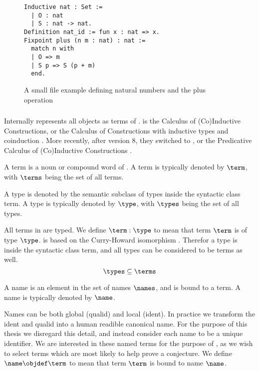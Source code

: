 \begin{figure}[H]
	\begin{lstlisting}[language=Coq, mathescape]
Inductive nat : Set :=
  | O : nat
  | S : nat -> nat.
Definition nat_id := fun x : nat => x.
Fixpoint plus (n m : nat) : nat :=
  match n with
  | O => m
  | S p => S (p + m)
  end.
	\end{lstlisting}
	\caption{A small \gallina \coq file example defining natural numbers and the plus operation}
\end{figure}
\subsubsection{\pcic}

Internally \coq represents all objects as terms  of \cic{}.
\cic is the Calculus of (Co)Inductive Constructions,
or the Calculus of Constructions \cite{coquand1988calculus} with inductive types and coinduction \cite{huet1987induction} \cite{coquand1990inductively}.
More recently, after \coq version 8, they switched to \pcic {}, or the Predicative Calculus of (Co)Inductive Constructions \cite{bertot2013interactive}.

\begin{definition}[term]
	A term is a noun or compound word of \pcic.
	A term is typically denoted by $\term$,
	with $\terms$ being the set of all terms.
\end{definition}

\begin{definition}[type]\label{def:type}
	A type is denoted by the semantic subclass of types inside the syntactic class term.
	A type is typically denoted by $\type$, with $\types$ being the set of all types.
\end{definition}

All terms in \coq are typed.
We define $\term : \type$ to mean that term $\term$ is of type $\type$.
\coq is based on the Curry-Howard isomorphism \cite{howard1980formulae}.
Therefor a type is inside the syntactic class term, and all types can be considered to be terms as well.
\[ \types \subseteq \terms \]

\begin{definition}[name]
	A name is an element in the set of names $\names$, and is bound to a term. A name is typically denoted by $\name$.
\end{definition}
Names can be both global (qualid) and local (ident).
In practice we transform the ident and qualid into a human readible canonical name.
For the purpose of this thesis we disregard this detail, and instead consider each name to be a unique identifier.
We are interested in these named terms for the purpose of \premiseselection,
as we wish to select terms which are most likely to help prove a conjecture.
We define $\name \objdef \term$ to mean that term $\term$ is bound to name $\name$.

